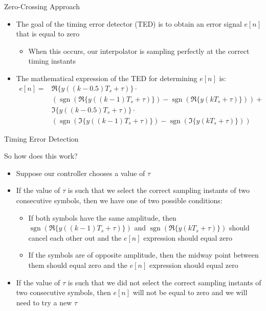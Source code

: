 \documentclass[10pt]{beamer}
\DeclareMathOperator{\sgn}{sgn}
\begin{document}
\begin{frame}[fragile]{Zero-Crossing Approach}

\begin{itemize}
 \item The goal of the timing error detector (TED) is to obtain an error signal $e[n]$ that is equal to zero
 \begin{itemize}
  \item When this occurs, our interpolator is sampling perfectly at the correct timing instants
 \end{itemize}
 \item The mathematical expression of the TED for determining $e[n]$ is:
 \begin{align}
  e[n]=&\Re\{y((k-0.5)T_s+\tau)\}\cdot\nonumber\\
  &(\sgn(\Re\{y((k-1)T_s+\tau)\})-\sgn(\Re\{y(kT_s+\tau)\}))+\nonumber\\
  &\Im\{y((k-0.5)T_s+\tau)\}\cdot\nonumber\\
  &(\sgn(\Im\{y((k-1)T_s+\tau)\})-\sgn(\Im\{y(kT_s+\tau)\}))
 \end{align}

\end{itemize}


\end{frame}


\begin{frame}[fragile]{Timing Error Detection}

So how does this work? 
\begin{itemize}
 \item Suppose our controller chooses a value of $\tau$
 \item If the value of $\tau$ is such that we select the correct sampling instants of two consecutive symbols, then we have one of two possible conditions:
 \begin{itemize}
  \item If both symbols have the same amplitude, then $\sgn(\Re\{y((k-1)T_s+\tau)\})$ and $\sgn(\Re\{y(kT_s+\tau)\})$ should cancel each other out and the $e[n]$ expression should equal zero
  \item If the symbols are of opposite amplitude, then the midway point between them should equal zero and the $e[n]$ expression should equal zero
 \end{itemize}
 \item If the value of $\tau$ is such that we did not select the correct sampling instants of two consecutive symbols, then $e[n]$ will not be equal to zero and we will need to try a new $\tau$
\end{itemize}



\end{frame}
\end{document}
